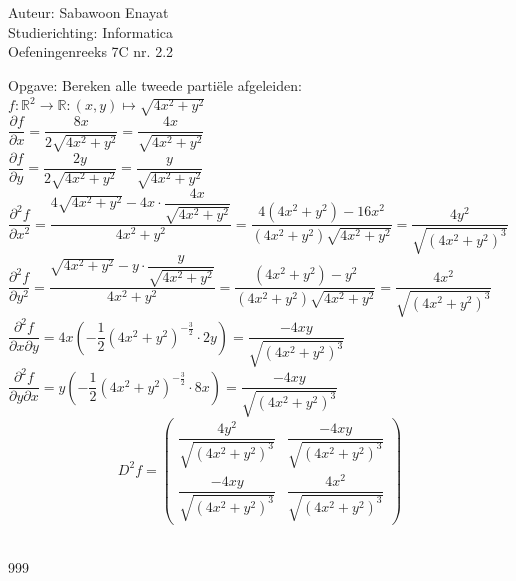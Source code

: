 \documentclass[a4paper]{article}
\begin{document}
  
\noindent \large Auteur: Sabawoon Enayat      \\
\noindent \large Studierichting: Informatica  \\
\noindent \large Oefeningenreeks 7C nr. 2.2 \\

\newcommand{\llim}{\lim\limits}

\medskip

\normalsize

Opgave: Bereken alle tweede parti\"ele afgeleiden:\\

$f: \mathbb{R}^2 \to \mathbb{R}: (x, y) \mapsto \sqrt{4x^2 + y^2}$\\

$\dfrac{\partial f}{\partial x} = \dfrac{8x}{2\sqrt{4x^2 + y^2}} = \dfrac{4x}{\sqrt{4x^2 + y^2}}$\\

$\dfrac{\partial f}{\partial y} = \dfrac{2y}{2\sqrt{4x^2 + y^2}} = \dfrac{y}{\sqrt{4x^2 + y^2}}$\\

$\dfrac{\partial^2 f}{\partial x^2} = \dfrac{4\sqrt{4x^2 + y^2} - 4x \cdot \dfrac{4x}{\sqrt{4x^2 + y^2}}}{4x^2 + y^2} = \dfrac{4(4x^2 + y^2) - 16x^2}{(4x^2 + y^2)\sqrt{4x^2 + y^2}} = \dfrac{4y^2}{\sqrt{(4x^2 + y^2)^3}}$\\

$\dfrac{\partial^2 f}{\partial y^2} = \dfrac{\sqrt{4x^2 + y^2} - y \cdot \dfrac{y}{\sqrt{4x^2 + y^2}}}{4x^2 + y^2} = \dfrac{(4x^2 + y^2) - y^2}{(4x^2 + y^2)\sqrt{4x^2 + y^2}} = \dfrac{4x^2}{\sqrt{(4x^2 + y^2)^3}}$\\

$\dfrac{\partial^2 f}{\partial x\partial y} = 4x(-\dfrac{1}{2}(4x^2 + y^2)^{-\tfrac{3}{2}} \cdot 2y) = \dfrac{-4xy}{\sqrt{(4x^2 + y^2)^3}}$\\

$\dfrac{\partial^2 f}{\partial y\partial x} = y(-\dfrac{1}{2}(4x^2 + y^2)^{-\tfrac{3}{2}} \cdot 8x) = \dfrac{-4xy}{\sqrt{(4x^2 + y^2)^3}}$\\

$$D^2f = \left(
	\begin{array}{cc}
		\dfrac{4y^2}{\sqrt{(4x^2 + y^2)^3}} & \dfrac{-4xy}{\sqrt{(4x^2 + y^2)^3}} \\
		\dfrac{-4xy}{\sqrt{(4x^2 + y^2)^3}} & \dfrac{4x^2}{\sqrt{(4x^2 + y^2)^3}}
	\end{array}
\right)$$\\

\begin{thebibliography}{999}
\end{thebibliography}
\end{document}

